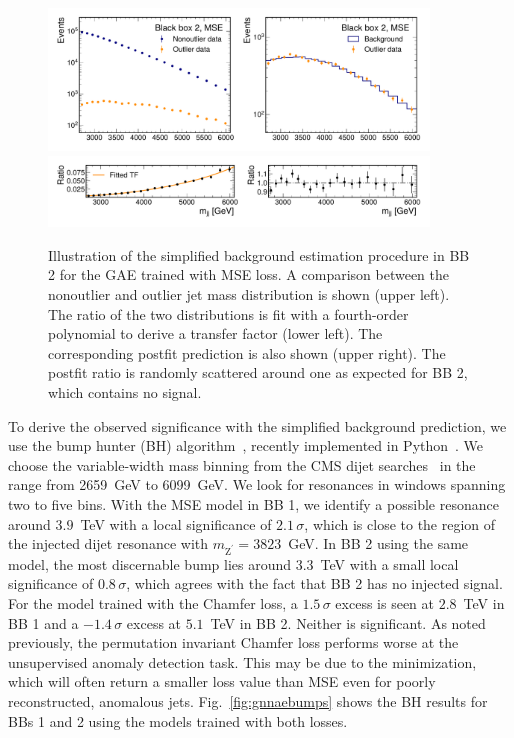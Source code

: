 \documentclass[letterpaper,11pt]{article}
\newcommand{\PZpr}{\ensuremath{\mathrm{Z}^{\prime}}\xspace} %
\begin{document}
\begin{figure}[htpb]
    \centering
    \includegraphics[width=0.9\textwidth]{figures/gae_mse/bb2_GNN_AE_EdgeConv_Finished_fit.pdf}\\
    \includegraphics[width=0.9\textwidth]{figures/gae_mse/bb2_GNN_AE_EdgeConv_Finished_fit_ratio.pdf}
    \caption{Illustration of the simplified background estimation procedure in BB 2 for the GAE trained with MSE loss. 
    A comparison between the nonoutlier and outlier jet mass distribution is shown (upper left). 
    The ratio of the two distributions is fit with a fourth-order polynomial to derive a transfer factor (lower left). 
    The corresponding postfit prediction is also shown (upper right). 
    The postfit ratio is randomly scattered around one as expected for BB 2, which contains no signal.}
    \label{fig:fit}
\end{figure}


To derive the observed significance with the simplified background prediction, we use the bump hunter (BH) algorithm~\cite{Choudalakis:2011qn}, recently implemented in Python~\cite{pybumphunter}.
We choose the variable-width mass binning from the CMS dijet searches~\cite{Sirunyan:2018xlo} in the range from 2659~GeV to 6099~GeV.
We look for resonances in windows spanning two to five bins.
With the MSE model in BB 1, we identify a possible resonance around $3.9$~TeV with a local significance of $2.1\,\sigma$, which is close to the region of the injected dijet resonance with $m_\PZpr=3823$~GeV.
In BB 2 using the same model, the most discernable bump lies around $3.3$~TeV with a small local significance of $0.8\,\sigma$, which agrees with the fact that BB 2 has no injected signal. 
For the model trained with the Chamfer loss, a $1.5\,\sigma$ excess is seen at $2.8$~TeV in BB 1 and a $-1.4\,\sigma$ excess at $5.1$~TeV in BB 2. 
Neither is significant.
As noted previously, the permutation invariant Chamfer loss performs worse at the unsupervised anomaly detection task.
This may be due to the minimization, which will often return a smaller loss value than MSE even for poorly reconstructed, anomalous jets.
Fig.~\ref{fig:gnnaebumps} shows the BH results for BBs 1 and 2 using the models trained with both losses.
\end{document}
